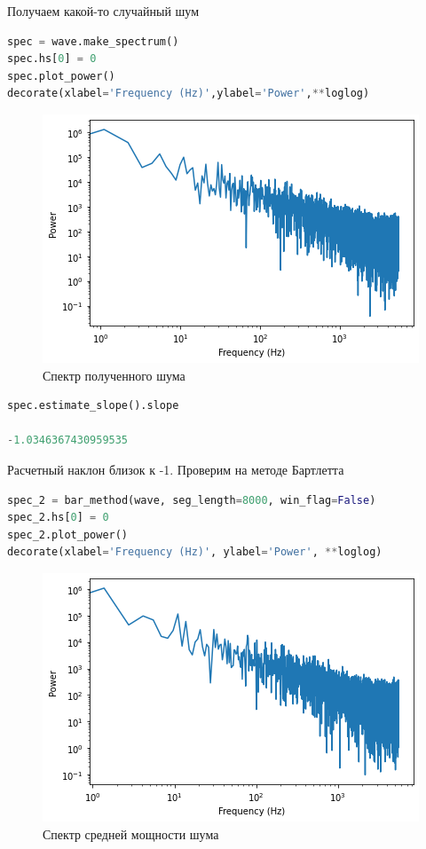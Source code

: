 Получаем какой-то случайный шум

\begin{lstlisting}[language=Python]
spec = wave.make_spectrum()
spec.hs[0] = 0
spec.plot_power()
decorate(xlabel='Frequency (Hz)',ylabel='Power',**loglog)
\end{lstlisting}

\begin{figure}[H]
	\begin{center}
		\includegraphics[scale=1]{fig/lab04/lab04_13.png}
		\caption{Спектр полученного шума}
	\end{center}
\end{figure}

\begin{lstlisting}[language=Python]
spec.estimate_slope().slope

-1.0346367430959535
\end{lstlisting}

Расчетный наклон близок к -1. Проверим на методе Бартлетта

\begin{lstlisting}[language=Python]
spec_2 = bar_method(wave, seg_length=8000, win_flag=False)
spec_2.hs[0] = 0
spec_2.plot_power()
decorate(xlabel='Frequency (Hz)', ylabel='Power', **loglog)
\end{lstlisting}


\begin{figure}[H]
	\begin{center}
		\includegraphics[scale=1]{fig/lab04/lab04_14.png}
		\caption{Спектр средней мощности шума}
	\end{center}
\end{figure}

